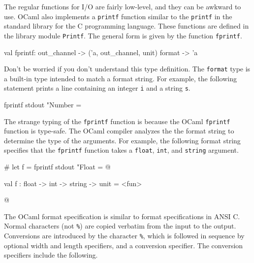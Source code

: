 %

The regular functions for I/O are fairly low-level, and they can be awkward to use.  OCaml also
implements a \hbox{\lstinline$printf$} function similar to the \hbox{\lstinline$printf$} in the
standard library for the C programming language.  These functions are defined in the library
module \hbox{\lstinline/Printf/}.  The general form is given by the
function \hbox{\lstinline/fprintf/}.

\begin{ocaml}
val fprintf: out_channel -> ('a, out_channel, unit) format -> 'a
\end{ocaml}
%
Don't be worried if you don't understand this type definition.  The \hbox{\lstinline/format/} type is
a built-in type intended to match a  format string.  For example, the following statement
prints a line containing an integer \hbox{\lstinline+i+} and a string \hbox{\lstinline+s+}.

\begin{ocaml}
fprintf stdout "Number = %
\end{ocaml}
%
The strange typing of the \hbox{\lstinline+fprintf+} function is because the
OCaml \hbox{\lstinline+fprintf+} function is type-safe.  The OCaml compiler analyzes the the format
string to determine the type of the arguments.  For example, the following format string specifies
that the \hbox{\lstinline/fprintf/} function takes
a \hbox{\lstinline$float$}, \hbox{\lstinline$int$}, and \hbox{\lstinline$string$} argument.

\begin{ocaml}
# let f = fprintf stdout "Float = %
@
\begin{topoutput}
val f : float -> int -> string -> unit = <fun>
\end{topoutput}
@
\end{ocaml}
%
The OCaml format specification is similar to format specifications in ANSI C.  Normal characters (not
\lstinline/%/)
are copied verbatim from the input to the output.  Conversions are introduced by the character
\lstinline/%/,
which is followed in sequence by optional width and length specifiers, and a conversion specifier.
The conversion specifiers include the following.

